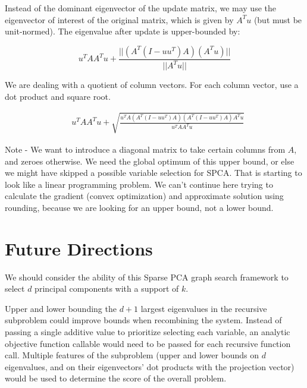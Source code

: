 \documentclass{article}
\begin{document}
Instead of the dominant eigenvector of the update matrix, we may use the eigenvector of interest of the original matrix, which is given by $A^T u$ (but must be unit-normed). The eigenvalue after update is upper-bounded by:

$$
u^T A A^T u + \frac{|| (A^T (I-uu^T) A) (A^T u) ||}{|| A^T u ||}
$$

We are dealing with a quotient of column vectors. For each column vector, use a dot product and square root.

\begin{equation*}
    \begin{aligned}
        & u^T A A^T u + \sqrt{\frac{u^T A (A^T (I-uu^T) A) (A^T (I-uu^T) A) A^T u}{u^T A A^T u}}
    \end{aligned}
\end{equation*}

Note - We want to introduce a diagonal matrix to take certain columns from $A$, and zeroes otherwise. We need the global optimum of this upper bound, or else we might have skipped a possible variable selection for SPCA. That is starting to look like a linear programming problem. We can't continue here trying to calculate the gradient (convex optimization) and approximate solution using rounding, because we are looking for an upper bound, not a lower bound.

\section{Future Directions}

We should consider the ability of this Sparse PCA graph search framework to select $d$ principal components with a support of $k$.


Upper and lower bounding the $d+1$ largest eigenvalues in the recursive subproblem could improve bounds when recombining the system. Instead of passing a single additive value to prioritize selecting each variable, an analytic objective function callable would need to be passed for each recursive function call. Multiple features of the subproblem (upper and lower bounds on $d$ eigenvalues, and on their eigenvectors' dot products with the projection vector) would be used to determine the score of the overall problem.
\end{document}
